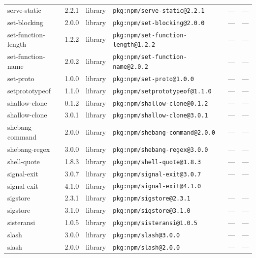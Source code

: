 \documentclass[11pt,a4paper]{article}
\begin{document}
\begin{longtable}{|p{4cm}|p{2cm}|p{1.6cm}|p{5cm}|p{1.5cm}|p{3.5cm}|}
\raggedright serve-static & 2.2.1 & library & \small\texttt{pkg:npm/serve-static@2.2.1} & — & \small — \\
\raggedright set-blocking & 2.0.0 & library & \small\texttt{pkg:npm/set-blocking@2.0.0} & — & \small — \\
\raggedright set-function-length & 1.2.2 & library & \small\texttt{pkg:npm/set-function-length@1.2.2} & — & \small — \\
\raggedright set-function-name & 2.0.2 & library & \small\texttt{pkg:npm/set-function-name@2.0.2} & — & \small — \\
\raggedright set-proto & 1.0.0 & library & \small\texttt{pkg:npm/set-proto@1.0.0} & — & \small — \\
\raggedright setprototypeof & 1.1.0 & library & \small\texttt{pkg:npm/setprototypeof@1.1.0} & — & \small — \\
\raggedright shallow-clone & 0.1.2 & library & \small\texttt{pkg:npm/shallow-clone@0.1.2} & — & \small — \\
\raggedright shallow-clone & 3.0.1 & library & \small\texttt{pkg:npm/shallow-clone@3.0.1} & — & \small — \\
\raggedright shebang-command & 2.0.0 & library & \small\texttt{pkg:npm/shebang-command@2.0.0} & — & \small — \\
\raggedright shebang-regex & 3.0.0 & library & \small\texttt{pkg:npm/shebang-regex@3.0.0} & — & \small — \\
\raggedright shell-quote & 1.8.3 & library & \small\texttt{pkg:npm/shell-quote@1.8.3} & — & \small — \\
\raggedright signal-exit & 3.0.7 & library & \small\texttt{pkg:npm/signal-exit@3.0.7} & — & \small — \\
\raggedright signal-exit & 4.1.0 & library & \small\texttt{pkg:npm/signal-exit@4.1.0} & — & \small — \\
\raggedright sigstore & 2.3.1 & library & \small\texttt{pkg:npm/sigstore@2.3.1} & — & \small — \\
\raggedright sigstore & 3.1.0 & library & \small\texttt{pkg:npm/sigstore@3.1.0} & — & \small — \\
\raggedright sisteransi & 1.0.5 & library & \small\texttt{pkg:npm/sisteransi@1.0.5} & — & \small — \\
\raggedright slash & 3.0.0 & library & \small\texttt{pkg:npm/slash@3.0.0} & — & \small — \\
\raggedright slash & 2.0.0 & library & \small\texttt{pkg:npm/slash@2.0.0} & — & \small — \\

\end{longtable}
\end{document}
